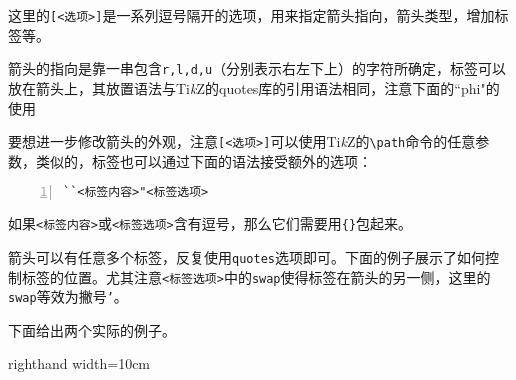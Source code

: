 \documentclass{ctexart}
\begin{document}
这里的\texttt{[<选项>]}是一系列逗号隔开的选项，用来指定箭头指向，箭头类型，增加标签等。

箭头的指向是靠一串包含\verb|r,l,d,u|（分别表示右左下上）的字符所确定，标签可以放在箭头上，其放置语法与Ti\emph{k}Z的quotes库的引用语法相同，注意下面的``phi"的使用
\begin{tcblisting}{}
\end{tcblisting}

要想进一步修改箭头的外观，注意\texttt{[<选项>]}可以使用Ti\emph{k}Z的\verb|\path|命令的任意参数，类似的，标签也可以通过下面的语法接受额外的选项：
\begin{lstlisting}[numbers=left]
``<标签内容>"<标签选项>
\end{lstlisting}
如果\texttt{<标签内容>}或\texttt{<标签选项>}含有逗号，那么它们需要用\verb|{}|包起来。
\begin{tcblisting}{}
\end{tcblisting}

箭头可以有任意多个标签，反复使用\texttt{quotes}选项即可。下面的例子展示了如何控制标签的位置。尤其注意\texttt{<标签选项>}中的\texttt{swap}使得标签在箭头的另一侧，这里的\texttt{swap}等效为撇号\texttt{'}。
\begin{tcblisting}{}
\end{tcblisting}
下面给出两个实际的例子。
\begin{tcblisting}{}
\end{tcblisting}
\begin{tcblisting}{righthand width=10cm}
\end{tcblisting}
\end{document}
